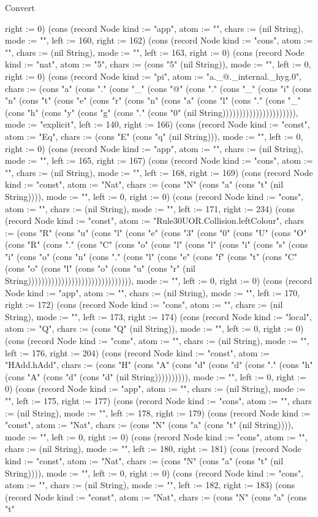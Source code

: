 \begin{lexlean}{Convert}
\begin{semanticmodule}
{right := 0}) (cons (record Node {kind := "app", atom := "", chars := (nil String), mode := "", left := 160, right := 162}) (cons (record Node {kind := "cons", atom := "", chars := (nil String), mode := "", left := 163, right := 0}) (cons (record Node {kind := "nat", atom := "5", chars := (cons "5" (nil String)), mode := "", left := 0, right := 0}) (cons (record Node {kind := "pi", atom := "a._@._internal._hyg.0", chars := (cons "a" (cons "." (cons "_" (cons "@" (cons "." (cons "_" (cons "i" (cons "n" (cons "t" (cons "e" (cons "r" (cons "n" (cons "a" (cons "l" (cons "." (cons "_" (cons "h" (cons "y" (cons "g" (cons "." (cons "0" (nil String)))))))))))))))))))))), mode := "explicit", left := 140, right := 166}) (cons (record Node {kind := "const", atom := "Eq", chars := (cons "E" (cons "q" (nil String))), mode := "", left := 0, right := 0}) (cons (record Node {kind := "app", atom := "", chars := (nil String), mode := "", left := 165, right := 167}) (cons (record Node {kind := "cons", atom := "", chars := (nil String), mode := "", left := 168, right := 169}) (cons (record Node {kind := "const", atom := "Nat", chars := (cons "N" (cons "a" (cons "t" (nil String)))), mode := "", left := 0, right := 0}) (cons (record Node {kind := "cons", atom := "", chars := (nil String), mode := "", left := 171, right := 234}) (cons (record Node {kind := "const", atom := "Rule30UOR.Collision.leftColour", chars := (cons "R" (cons "u" (cons "l" (cons "e" (cons "3" (cons "0" (cons "U" (cons "O" (cons "R" (cons "." (cons "C" (cons "o" (cons "l" (cons "l" (cons "i" (cons "s" (cons "i" (cons "o" (cons "n" (cons "." (cons "l" (cons "e" (cons "f" (cons "t" (cons "C" (cons "o" (cons "l" (cons "o" (cons "u" (cons "r" (nil String))))))))))))))))))))))))))))))), mode := "", left := 0, right := 0}) (cons (record Node {kind := "app", atom := "", chars := (nil String), mode := "", left := 170, right := 172}) (cons (record Node {kind := "cons", atom := "", chars := (nil String), mode := "", left := 173, right := 174}) (cons (record Node {kind := "local", atom := "Q", chars := (cons "Q" (nil String)), mode := "", left := 0, right := 0}) (cons (record Node {kind := "cons", atom := "", chars := (nil String), mode := "", left := 176, right := 204}) (cons (record Node {kind := "const", atom := "HAdd.hAdd", chars := (cons "H" (cons "A" (cons "d" (cons "d" (cons "." (cons "h" (cons "A" (cons "d" (cons "d" (nil String)))))))))), mode := "", left := 0, right := 0}) (cons (record Node {kind := "app", atom := "", chars := (nil String), mode := "", left := 175, right := 177}) (cons (record Node {kind := "cons", atom := "", chars := (nil String), mode := "", left := 178, right := 179}) (cons (record Node {kind := "const", atom := "Nat", chars := (cons "N" (cons "a" (cons "t" (nil String)))), mode := "", left := 0, right := 0}) (cons (record Node {kind := "cons", atom := "", chars := (nil String), mode := "", left := 180, right := 181}) (cons (record Node {kind := "const", atom := "Nat", chars := (cons "N" (cons "a" (cons "t" (nil String)))), mode := "", left := 0, right := 0}) (cons (record Node {kind := "cons", atom := "", chars := (nil String), mode := "", left := 182, right := 183}) (cons (record Node {kind := "const", atom := "Nat", chars := (cons "N" (cons "a" (cons "t" }
\end{semanticmodule}
\end{lexlean}
